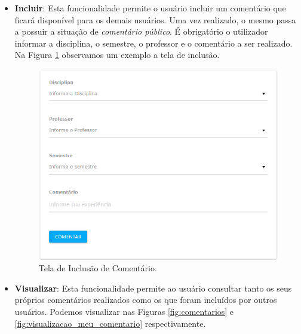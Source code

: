 \documentclass[12pt, a4paper]{report}
\begin{document}
\begin{itemize}
\item \textbf{Incluir}: Esta funcionalidade permite o usuário incluir um comentário que ficará disponível para os demais usuários. Uma vez realizado, o mesmo passa a possuir a situação de \textit{comentário público}. É obrigatório o utilizador informar a disciplina, o semestre, o professor e o comentário a ser realizado. Na Figura \ref{fig:incluir_comentario} observamos um exemplo a tela de inclusão.

\begin{figure}
\centering
\includegraphics[scale=0.59]{incluir_comentario2.png}
\caption{Tela de Inclusão de Comentário.}
\label{fig:incluir_comentario}
\end{figure}

\item \textbf{Visualizar}: Esta funcionalidade permite ao usuário consultar tanto os seus próprios comentários realizados como os que foram incluídos por outros usuários. Podemos visualizar nas Figuras \ref{fig:comentarios} e \ref{fig:visualizacao_meu_comentario} respectivamente.


\end{itemize}
\end{document}
